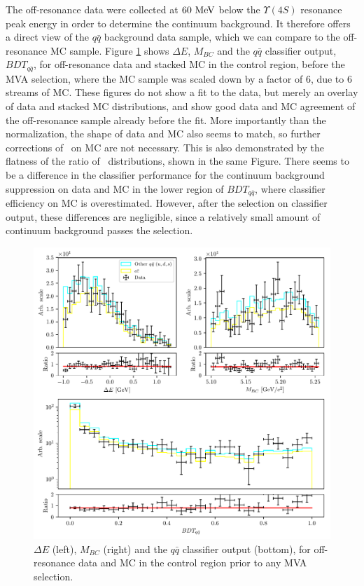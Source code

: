 The off-resonance data were collected at $60\mathrm{~MeV}$ below the $\Upsilon(4S)$ resonance peak energy in order to determine the continuum background. It therefore offers a direct view of the $q\bar q$ background data sample, which we can compare to the off-resonance MC sample. Figure \ref{fig:offres_control} shows $\Delta E$, $M_{BC}$ and the $q \bar q$ classifier output, $BDT_{q\bar q}$, for off-resonance data and stacked MC in the control region, before the MVA selection, where the MC sample was scaled down by a factor of $6$, due to 6 streams of MC. These figures do not show a fit to the data, but merely an overlay of data and stacked MC distributions, and show good data and MC agreement of the off-resonance sample already before the fit. More importantly than the normalization, the shape of data and MC also seems to match, so further corrections of \vars~on MC are not necessary. This is also demonstrated by the flatness of the ratio of \vars~distributions, shown in the same Figure. There seems to be a difference in the classifier performance for the continuum background suppression on data and MC in the lower region of $BDT_{q \bar q}$, where classifier efficiency on MC is overestimated. However, after the selection on classifier output, these differences are negligible, since a relatively small amount of continuum background passes the selection.
\begin{figure}[H]
	\centering
	\captionsetup{width=0.8\linewidth}
	\includegraphics[width=\linewidth]{fig/offres_control}
	\caption{$\Delta E$ (left), $M_{BC}$ (right) and the $q \bar q$ classifier output (bottom), for off-resonance data and MC in the control region prior to any MVA selection.}
	\label{fig:offres_control}
\end{figure}

